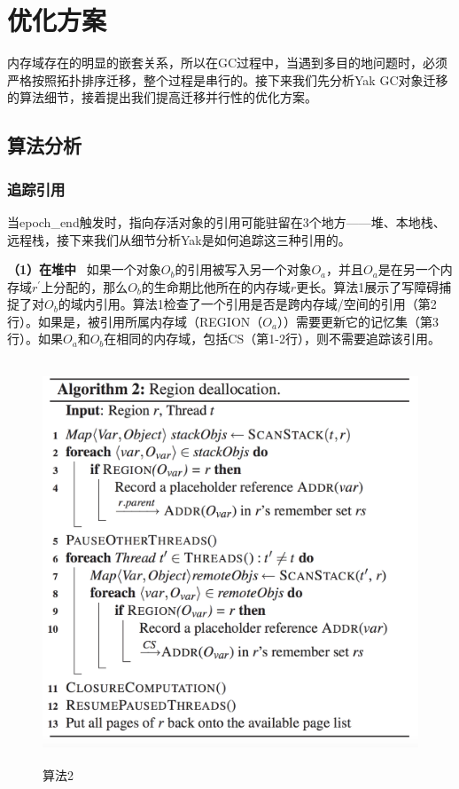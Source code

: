 
\chapter{优化方案}
内存域存在的明显的嵌套关系，所以在GC过程中，当遇到多目的地问题时，必须严格按照拓扑排序迁移，整个过程是串行的。接下来我们先分析Yak GC对象迁移的算法细节，接着提出我们提高迁移并行性的优化方案。

\section{算法分析}
\subsection{追踪引用}
当epoch\_end触发时，指向存活对象的引用可能驻留在3个地方——堆、本地栈、远程栈，接下来我们从细节分析Yak是如何追踪这三种引用的。

\textbf{（1）在堆中}  \ 如果一个对象$O_b$的引用被写入另一个对象$O_a$，并且$O_a$是在另一个内存域$r^{'}$上分配的，那么$O_b$的生命期比他所在的内存域$r$更长。算法1展示了写障碍捕捉了对$O_b$的域内引用。算法1检查了一个引用是否是跨内存域/空间的引用（第2行）。如果是，被引用所属内存域（REGION（$O_a$））需要更新它的记忆集（第3行）。如果$O_a$和$O_b$在相同的内存域，包括CS（第1-2行），则不需要追踪该引用。
\begin{figure}[H]
    \centering
    \includegraphics[width=12cm,height=12cm]{figure/algorithm2.jpg}
    \caption{
        算法2
    }
    \label{algorithm2}
\end{figure}

